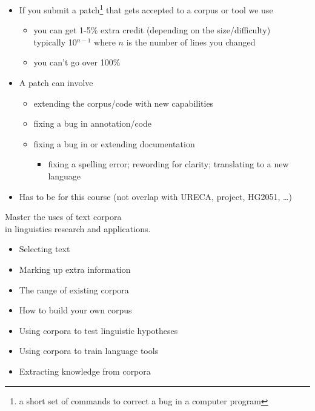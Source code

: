 \documentclass[a4paper,landscape,headrule,footrule,xetex]{foils}
\begin{document}

\begin{itemize}
\item If you submit a patch\footnote{a short set of commands to correct a bug in a computer program} that gets accepted to a corpus or tool we use
  \begin{itemize}
  \item you can get 1-5\% extra credit (depending on the size/difficulty)
    \\ typically 10$^{n-1}$ where $n$ is the number of lines you changed
  \item you can't go over 100\%
  \end{itemize}
\item A patch can involve
  \begin{itemize}
  \item extending the corpus/code with new capabilities
  \item fixing a bug in annotation/code
  \item fixing a bug in or extending documentation
    \begin{itemize}
    \item fixing a spelling error; rewording for clarity; translating to a new language
    \end{itemize}
  \end{itemize}
\item Has to be for this course (not overlap with URECA, project, HG2051, \ldots)
\end{itemize}



\begin{center}
  \LARGE 
Master the uses of text corpora 
\\ in linguistics research and applications.
\end{center}
\begin{itemize}\addtolength{\itemsep}{-1ex}
\item Selecting text
\item Marking up extra information
\item The range of existing corpora
\item How to build your own corpus
\item Using corpora to test linguistic hypotheses
\item Using corpora to train language tools
\item Extracting knowledge from corpora
\end{itemize}
\end{document}
